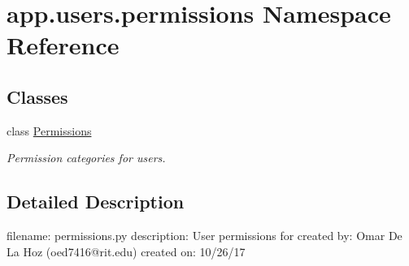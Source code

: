 \hypertarget{namespaceapp_1_1users_1_1permissions}{}\section{app.\+users.\+permissions Namespace Reference}
\label{namespaceapp_1_1users_1_1permissions}
\subsection*{Classes}
\begin{DoxyCompactItemize}
\item 
class \mbox{\hyperlink{classapp_1_1users_1_1permissions_1_1_permissions}{Permissions}}
\begin{DoxyCompactList}\small\item\em Permission categories for users. \end{DoxyCompactList}\end{DoxyCompactItemize}


\subsection{Detailed Description}
\begin{DoxyVerb}filename: permissions.py
description: User permissions for
created by: Omar De La Hoz (oed7416@rit.edu)
created on: 10/26/17
\end{DoxyVerb}
 
